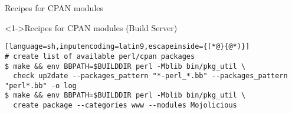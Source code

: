 \documentclass[ngerman,xcolor={table,dvipsnames},smaller,compress,hyperref={bookmarks,colorlinks},handout]{beamer}%
\begin{document}
\begin{frame}[fragile]{Recipes for CPAN modules}
\begin{block}<1->{Recipes for CPAN modules (Build Server)}
\small
\begin{lstlisting}[language=sh,inputencoding=latin9,escapeinside={(*@}{@*)}]
# create list of available perl/cpan packages
$ make && env BBPATH=$BUILDDIR perl -Mblib bin/pkg_util \
  check up2date --packages_pattern "*-perl_*.bb" --packages_pattern "perl*.bb" -o log
$ make && env BBPATH=$BUILDDIR perl -Mblib bin/pkg_util \
  create package --categories www --modules Mojolicious
\end{lstlisting}
\end{block}
\end{frame}
\end{document}
